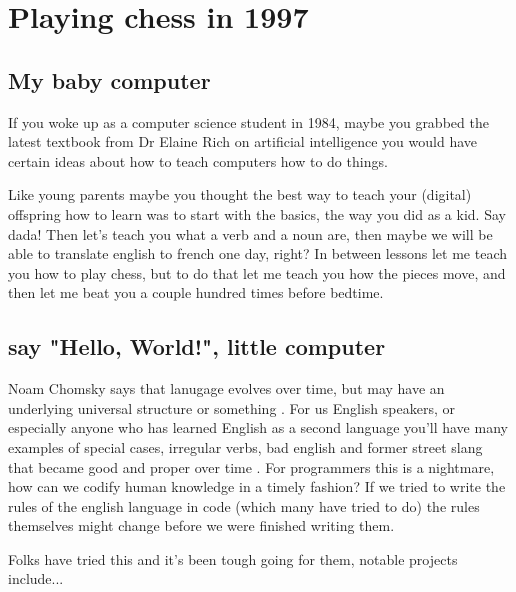 \setchapterpreamble[u]{\margintoc}
\chapter{Playing chess in 1997}

\section{My baby computer}

If you woke up as a computer science student in 1984, maybe you grabbed the latest textbook from Dr Elaine Rich on artificial intelligence  you would have certain ideas about how to teach computers how to do things. 

Like young parents  maybe you thought the best way to teach your (digital) offspring how to learn was to start with the basics, the way you did as a kid. Say dada! Then let's teach you what a verb and a noun are, then maybe we will be able to translate english to french one day, right? In between lessons let me teach you how to play chess, but to do that let me teach you how the pieces move, and then let me beat you a couple hundred times before bedtime. 

\section{say "Hello, World!", little computer}

Noam Chomsky  says that lanugage evolves over time, but may have an underlying universal structure or something . For us English speakers, or especially anyone who has learned English as a second language you'll have many examples of special cases, irregular verbs, bad english and former street slang that became good and proper over time . For programmers this is a nightmare, how can we codify human knowledge in a timely fashion? If we tried to write the rules of the english language in code (which many have tried to do) the rules themselves might change before we were finished writing them.

Folks have tried this and it's been tough going for them, notable projects include...

